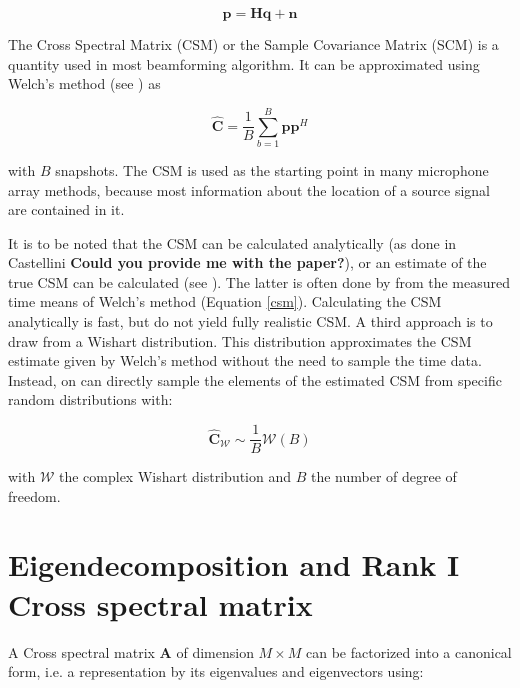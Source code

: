 \documentclass[11pt,a4paper,twoside]{report}
\begin{document}
\begin{equation}
    \mathbf{p} = \mathbf{H} \mathbf{q} + \mathbf{n}
\end{equation}

The Cross Spectral Matrix (CSM) or the Sample Covariance Matrix (SCM) is a quantity used in most beamforming algorithm. It can be approximated using Welch's method (see \cite{welch1967use}) as


\begin{equation}
    \label{csm}
    \hat{\mathbf{C}} = \frac{1}{B} \sum_{b = 1}^{B} \mathbf{p}\mathbf{p}^H
\end{equation}

with $B$ snapshots. The CSM is used as the starting point in many microphone array methods, because most information about the location of a source signal are contained in it.

It is to be noted that the CSM can be calculated analytically (as done in Castellini \textbf{Could you provide me with the paper?}), or an estimate of the true CSM can be calculated (see \cite{kujawski2022fast}). The latter is often done by from the measured time means of Welch's method (Equation \ref{csm}). Calculating the CSM analytically is fast, but do not yield fully realistic CSM. A third approach is to draw from a Wishart distribution. This distribution approximates the CSM estimate given by Welch's method without the need to sample the time data. Instead, on can directly sample the elements of the estimated CSM from specific random distributions with:

\begin{equation}
    \hat{\mathbf{C}}_{\mathcal{W}} \sim \frac{1}{B}\mathcal{W}(B)
\end{equation}

with $\mathcal{W}$ the complex Wishart distribution and $B$ the number of degree of freedom.

\section{Eigendecomposition and Rank I Cross spectral matrix}

A Cross spectral matrix $\mathbf{A}$ of dimension $M \times M$ can be factorized into a canonical form, i.e. a representation by its eigenvalues and eigenvectors using:
\end{document}
